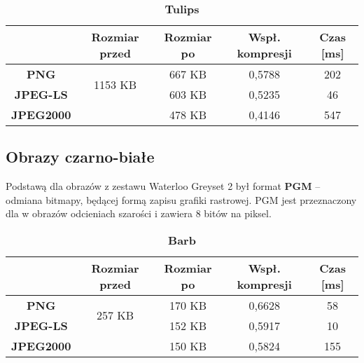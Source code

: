 \begin{table}[!h]
	\centering
	\caption{\textbf{Tulips}}
	\label{my-label}
	\begin{tabular}{|c|c|c|c|c|}                                             
		\hline
		& \textbf{Rozmiar przed} & \textbf{Rozmiar po} & \textbf{Wspł. kompresji} & \textbf{Czas {[}ms{]}} \\ \hline 
		\textbf{PNG}      &          \multicolumn{1}{c|}{\multirow{2}{*}{1153 KB}}             &        667 KB             &      0,5788                    &          202                   \\\cline{3-5}
		\textbf{JPEG-LS}  &                        &      603  KB             &       0,5235                   &          46                \\\cline{3-5}
		\textbf{JPEG2000} &                        &      478 KB               &       0,4146                   &     547                 \\ \hline
	\end{tabular}
\end{table}











\subsection{Obrazy czarno-białe}

Podstawą dla obrazów z zestawu Waterloo Greyset 2 był format \textbf{PGM} -- odmiana bitmapy, będącej formą zapisu grafiki rastrowej. PGM jest przeznaczony dla w obrazów odcieniach szarości i zawiera 8 bitów na piksel.

\begin{table}[!h]
	\centering
	\caption{\textbf{Barb}}
	\label{my-label}
	\begin{tabular}{|c|c|c|c|c|}                                             
		\hline
		& \textbf{Rozmiar przed} & \textbf{Rozmiar po} & \textbf{Wspł. kompresji} & \textbf{Czas {[}ms{]}} \\ \hline 
		\textbf{PNG}      &          \multicolumn{1}{c|}{\multirow{2}{*}{257 KB}}             &      170 KB               &    0,6628                      &           58                  \\\cline{3-5}
		\textbf{JPEG-LS}  &                        &       152 KB              &        0,5917                  &        10                  \\\cline{3-5}
		\textbf{JPEG2000} &                        &     150 KB                &        0,5824                  &        155              \\ \hline
	\end{tabular}
\end{table}

